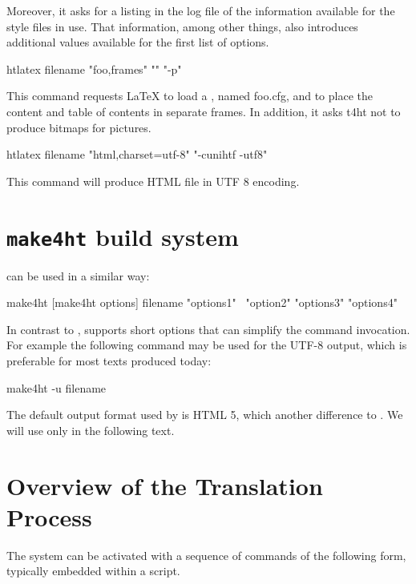 Moreover, it asks for a listing in the log file of the information available
for the style files in use. That information, among other things, also
introduces additional values available for the first list of options.

\begin{shellcommand}
htlatex filename "foo,frames" "" "-p"
\end{shellcommand}

This command requests LaTeX to load a , named
foo.cfg, and to place the content and table of contents in separate frames. In
addition, it asks t4ht not to produce bitmaps for pictures. 

\begin{shellcommand}
htlatex filename "html,charset=utf-8" "-cunihtf -utf8"
\end{shellcommand}

This command will produce HTML file in UTF 8 encoding. 

\section{\texttt{make4ht} build system}

 can be used in a similar way:

\begin{shellcommand}
make4ht [make4ht options] filename "options1" \
"option2" "options3" "options4"
\end{shellcommand}

In contrast to ,  supports short options
that can simplify the command invocation. For example the following command may
be used for the UTF-8 output, which is preferable for most texts produced
today:

\begin{shellcommand}
make4ht -u filename
\end{shellcommand}

The default output format used by  is HTML 5, which another
difference to \shellcmd{htlatex}. We will use only \shellcmd{make4ht} in the
following text.


\section{Overview of the Translation Process}\label{sec:overview}



The system can be activated with a sequence of commands of the following form, typically embedded within a script.

